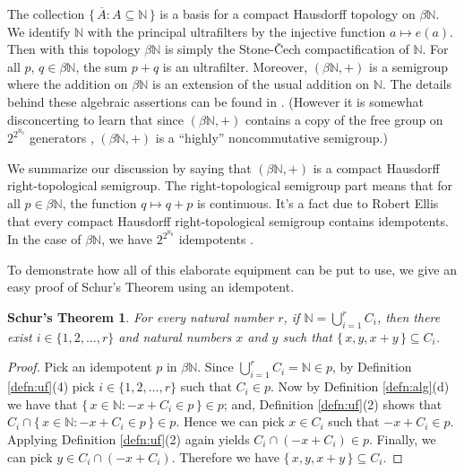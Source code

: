 \documentclass[12pt]{article}
\theoremstyle{plain}
\newtheorem{schur}[thm]{Schur's Theorem}
\theoremstyle{definition}
\newcommand{\bbN}{\mathbb{N}}
\begin{document}
The collection $\{\, \overline{A} : A \subseteq \bbN \,\}$ is a
basis for a compact Hausdorff topology on $\beta\bbN$.
We identify $\bbN$ with the principal ultrafilters by the injective
function $a \mapsto e(a)$. 
Then with this topology $\beta\bbN$ is simply the Stone-\v{C}ech
compactification of $\bbN$. 
For all $p$, $q \in \beta\bbN$, the sum $p+q$ is an ultrafilter.
Moreover, $(\beta\bbN, +)$ is a semigroup where the addition on
$\beta\bbN$ is an extension of the usual addition on $\bbN$. 
The details behind these algebraic assertions can be found in
\cite[Chapter 4 Section 1]{Hindman:1998fk}.
(However it is somewhat disconcerting to learn that since $(\beta\bbN,
+)$ contains a copy of the free group on $2^{2^{\aleph_0}}$ generators
\cite[Corollary 7.36]{Hindman:1998fk}, $(\beta\bbN,+)$ is a ``highly''
noncommutative semigroup.)

We summarize our discussion by saying that $(\beta\bbN,
+)$ is a compact Hausdorff right-topological semigroup. 
The right-topological semigroup part means that for all $p \in
\beta\bbN$, the function $q \mapsto q+p$ is continuous.
It's a fact due to Robert Ellis \cite[Corollary 2.10]{Ellis:1969zr}
that every compact Hausdorff right-topological semigroup contains
idempotents. 
In the case of $\beta\bbN$, we have 
$2^{2^{\aleph_0}}$ idempotents \cite[Theorem 6.44]{Hindman:1998fk}. 

To demonstrate how all of this elaborate equipment can be put to use,
we give an easy proof of Schur's Theorem using an idempotent.
\begin{schur}
  For every natural number $r$, if  \/ $\bbN = \bigcup_{i=1}^r C_i$,
  then there exist $i \in \{1, 2, \ldots, r\}$ and natural numbers
  $x$ and $y$ such that $\{\, x, y, x+y \,\} \subseteq C_i$.
\end{schur}
\begin{proof}
  Pick an idempotent $p$ in $\beta\bbN$.
  Since $\bigcup_{i=1}^r C_i = \bbN \in p$, by Definition
  \ref{defn:uf}(4) pick $i \in \{1, 2, \ldots, r\}$ such that $C_i \in
  p$.
  Now by Definition \ref{defn:alg}(d) we have that $\{\, x \in \bbN :
  -x + C_i \in p \,\} \in p$; and, Definition \ref{defn:uf}(2) shows
  that $C_i \cap \{\, x \in \bbN : -x + C_i \in p \,\} \in p$.
  Hence we can pick $x \in C_i$ such that $-x + C_i \in p$. 
  Applying Definition \ref{defn:uf}(2) again yields $C_i \cap (-x +
  C_i) \in p$.
  Finally, we can pick $y \in C_i \cap (-x+C_i)$.
  Therefore we have $\{\, x, y, x+y \,\} \subseteq C_i$.
\end{proof}
\end{document}
